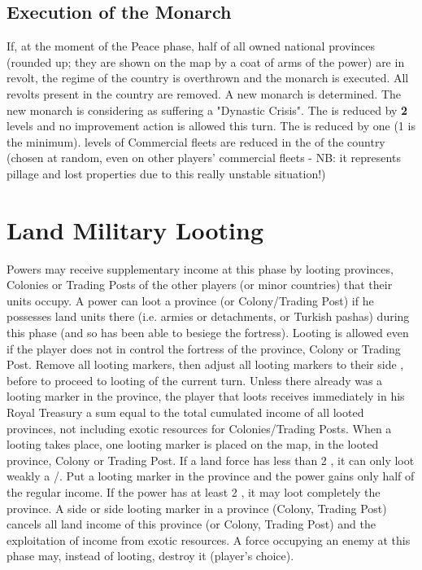\subsection{Execution of the
  Monarch}\label{chRedep:Execution Monarch by Revolts}
\aparag If, at the moment of the Peace phase, half of all owned national
provinces (rounded up; they are shown on the map by a coat of arms of the
power) are in revolt, the regime of the country is overthrown and the monarch
is executed.
\aparag[Consequences]
All revolts present in the country are removed. A new monarch is
determined. The new monarch is considering as suffering a "Dynastic Crisis".
\bparag The \STAB is reduced by \textbf{2} levels%
and no \STAB improvement action is allowed this turn.
\bparag The \DTI is reduced by one (1 is the minimum).
 levels of Commercial fleets are reduced in the \CTZ of the country
(chosen at random, even on other players' commercial fleets - NB: it
represents pillage and lost properties due to this really unstable situation!)



\section{Land Military Looting}\label{chRedep:Looting}

Powers may receive supplementary income at this phase by looting provinces,
Colonies or Trading Posts of the other players (or minor countries) that their
units occupy.
\aparag A power can loot a province (or Colony/Trading Post) if he possesses
land units there (i.e. armies or detachments, or Turkish pashas) during this
phase (and so has been able to besiege the fortress).  Looting is allowed even
if the player does not in control the fortress of the province, Colony or
Trading Post.
Remove all \Facemoins looting markers, then adjust all \Faceplus looting
markers to their side \Facemoins, before to proceed to looting of the current
turn.
Unless there already was a looting marker in the province, the player that
loots receives immediately in his Royal Treasury a sum equal to the total
cumulated income of all looted provinces, not including exotic resources for
Colonies/Trading Posts.
When a looting takes place, one looting marker \Faceplus is placed on the map,
in the looted province, Colony or Trading Post.
If a land force has less than 2 \LD, it can only loot weakly a \COL/\TP.  Put
a \Facemoins looting marker in the province and the power gains only half of
the regular income.  If the power has at least 2 \LD, it may loot completely
the province.
A side \Faceplus or side \Facemoins looting marker in a province (Colony,
Trading Post) cancels all land income of this province (or Colony, Trading
Post) and the exploitation of income from exotic resources.
A force occupying an enemy \TP at this phase may, instead of looting, destroy
it (player's choice).



